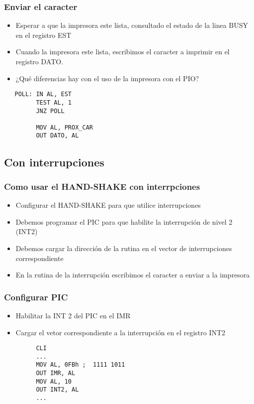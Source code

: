 \documentclass{beamer}
\begin{document}
\begin{frame}[fragile]
\frametitle{Enviar el caracter}
\begin{itemize}
 \item Esperar a que la impresora este lista, consultado el estado de la linea BUSY en el registro EST
 \item Cuando la impresora este lista, escribimos el caracter a imprimir en el registro DATO.
 \item ¿Qué diferencias hay con el uso de la impresora con el PIO?
\end{itemize}
\begin{block}{}
 \begin{verbatim}
   POLL: IN AL, EST
         TEST AL, 1
         JNZ POLL

         MOV AL, PROX_CAR
         OUT DATO, AL
 \end{verbatim}
\end{block}
\end{frame}

\subsection{Con interrupciones}
\begin{frame}[fragile]
\frametitle{Como usar el HAND-SHAKE con interrpciones}
\begin{itemize}
 \item Configurar el HAND-SHAKE para que utilice interrupciones
 \item Debemos programar el PIC para que habilite la interrupción de nivel 2 (INT2)
 \item Debemos cargar la dirección de la rutina en el vector de interrupciones correspondiente
 \item En la rutina de la interrupción escribimos el caracter a enviar a la impresora
\end{itemize}
\end{frame}

\begin{frame}[fragile]
\frametitle{Configurar PIC}
\begin{itemize}
 \item Habilitar la INT 2 del PIC en el IMR
 \item Cargar el vetor correspondiente a la interrupción en el registro INT2
\end{itemize}
\begin{block}{}
 \begin{verbatim}
         CLI
         ...
         MOV AL, 0FBh ;  1111 1011 
         OUT IMR, AL
         MOV AL, 10
         OUT INT2, AL
         ...
 \end{verbatim}
\end{block}
\end{frame}
\end{document}
